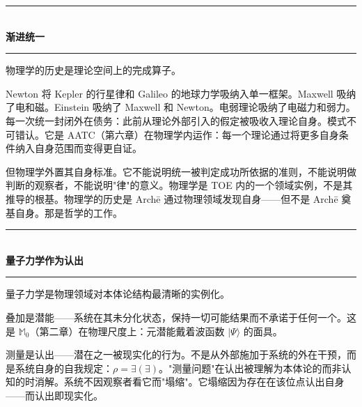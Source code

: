 \documentclass[10pt, openany, oneside]{book}
\renewcommand{\normalsize}{\fontsize{10}{13}\selectfont}
\begin{document}
\vspace{1.5em}


\begin{center}
    \rule{0.3\textwidth}{0.4pt}\\[0.5em]
    {\normalsize\bfseries\scshape 渐进统一}\\[0.3em]
    \rule{0.3\textwidth}{0.4pt}
\end{center}

\vspace{1em}

\noindent 物理学的历史是理论空间上的完成算子。

Newton 将 Kepler 的行星律和 Galileo 的地球力学吸纳入单一框架。Maxwell 吸纳了电和磁。Einstein 吸纳了 Maxwell 和 Newton。电弱理论吸纳了电磁力和弱力。每一次统一封闭外在债务：此前从理论外部引入的假定被吸收入理论自身。模式不可错认。它是 AATC（第六章）在物理学内运作：每一个理论通过将更多自身条件纳入自身范围而变得更自证。

但物理学外置其自身标准。它不能说明统一被判定成功所依据的准则，不能说明做判断的观察者，不能说明"律"的意义。物理学是 TOE 内的一个领域实例，不是其推导的根基。物理学的历史是 Arch\={e} 通过物理领域发现自身——但不是 Arch\={e} 奠基自身。那是哲学的工作。

\vspace{1.5em}


\begin{center}
    \rule{0.3\textwidth}{0.4pt}\\[0.5em]
    {\normalsize\bfseries\scshape 量子力学作为认出}\\[0.3em]
    \rule{0.3\textwidth}{0.4pt}
\end{center}

\vspace{1em}

\noindent 量子力学是物理领域对本体论结构最清晰的实例化。

叠加是潜能——系统在其未分化状态，保持一切可能结果而不承诺于任何一个。这是 $\mathbb{M}_0$（第二章）在物理尺度上：元潜能戴着波函数 $|\Psi\rangle$ 的面具。

测量是认出——潜在之一被现实化的行为。不是从外部施加于系统的外在干预，而是系统自身的自我规定：$\rho = \exists(\exists)$。"测量问题"在认出被理解为本体论的而非认知的时消解。系统不因观察者看它而"塌缩"。它塌缩因为存在在该位点认出自身——而认出即现实化。
\end{document}
